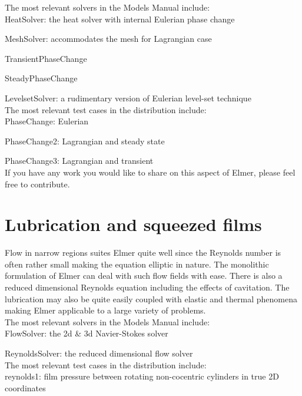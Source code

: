 \noindent The most relevant solvers in the Models Manual include:\\

    HeatSolver: the heat solver with internal Eulerian phase change

    MeshSolver: accommodates the mesh for Lagrangian case

    TransientPhaseChange

    SteadyPhaseChange

    LevelsetSolver: a rudimentary version of Eulerian level-set technique\\

\noindent The most relevant test cases in the distribution include:\\

    PhaseChange: Eulerian

    PhaseChange2: Lagrangian and steady state

    PhaseChange3: Lagrangian and transient\\

\noindent If you have any work you would like to share on this aspect of Elmer, please feel free to contribute. 

\section{Lubrication and squeezed films}

Flow in narrow regions suites Elmer quite well since the Reynolds number is often rather small making the equation elliptic in nature. The monolithic formulation of Elmer can deal with such flow fields with ease. There is also a reduced dimensional Reynolds equation including the effects of cavitation. The lubrication may also be quite easily coupled with elastic and thermal phenomena making Elmer applicable to a large variety of problems.\\

\noindent The most relevant solvers in the Models Manual include:\\

    FlowSolver: the 2d \& 3d Navier-Stokes solver

    ReynoldsSolver: the reduced dimensional flow solver\\

\noindent The most relevant test cases in the distribution include:\\

    reynolds1: film pressure between rotating non-cocentric cylinders in true 2D coordinates

